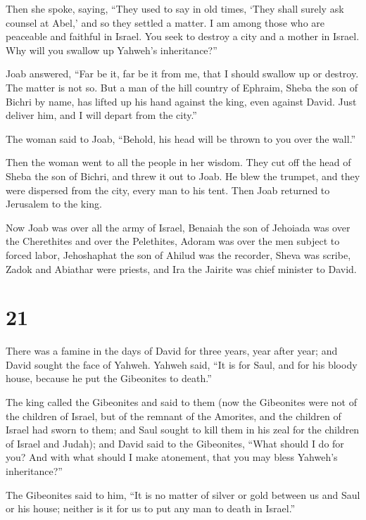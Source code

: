  Then she spoke, saying, ``They used to say in old times,
`They shall surely ask counsel at Abel,' and so they settled a matter.
 I am among those who are peaceable and faithful in Israel.
You seek to destroy a city and a mother in Israel. Why will you swallow
up Yahweh's inheritance?''

 Joab answered, ``Far be it, far be it from me, that I
should swallow up or destroy.  The matter is not so. But a
man of the hill country of Ephraim, Sheba the son of Bichri by name, has
lifted up his hand against the king, even against David. Just deliver
him, and I will depart from the city.''

The woman said to Joab, ``Behold, his head will be thrown to you over
the wall.''

 Then the woman went to all the people in her wisdom. They
cut off the head of Sheba the son of Bichri, and threw it out to Joab.
He blew the trumpet, and they were dispersed from the city, every man to
his tent. Then Joab returned to Jerusalem to the king.

 Now Joab was over all the army of Israel, Benaiah the son
of Jehoiada was over the Cherethites and over the Pelethites,
 Adoram was over the men subject to forced labor,
Jehoshaphat the son of Ahilud was the recorder,  Sheva was
scribe, Zadok and Abiathar were priests,  and Ira the
Jairite was chief minister to David.

\hypertarget{section-20}{%
\section{21}\label{section-20}}

 There was a famine in the days of David for three years,
year after year; and David sought the face of Yahweh. Yahweh said, ``It
is for Saul, and for his bloody house, because he put the Gibeonites to
death.''

 The king called the Gibeonites and said to them (now the
Gibeonites were not of the children of Israel, but of the remnant of the
Amorites, and the children of Israel had sworn to them; and Saul sought
to kill them in his zeal for the children of Israel and Judah);
 and David said to the Gibeonites, ``What should I do for
you? And with what should I make atonement, that you may bless Yahweh's
inheritance?''

 The Gibeonites said to him, ``It is no matter of silver or
gold between us and Saul or his house; neither is it for us to put any
man to death in Israel.''

